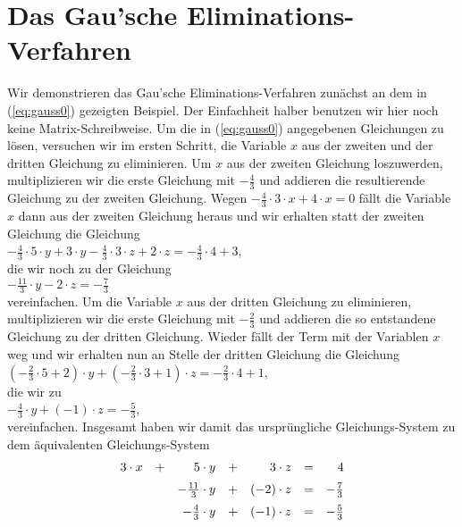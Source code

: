 \section{Das Gau\3'sche Eliminations-Verfahren}
Wir demonstrieren das Gau\3'sche Eliminations-Verfahren zun\"{a}chst an dem in (\ref{eq:gauss0}) gezeigten
Beispiel.  Der Einfachheit halber benutzen wir hier noch keine Matrix-Schreibweise.
Um die in (\ref{eq:gauss0}) angegebenen Gleichungen zu l\"{o}sen, versuchen wir im ersten Schritt, die
Variable $x$ aus der zweiten und der dritten Gleichung zu eliminieren.  Um $x$ aus der zweiten Gleichung
loszuwerden, multiplizieren wir die erste Gleichung mit $-\frac{4}{3}$ und addieren die resultierende
Gleichung zu der zweiten Gleichung.  Wegen $-\frac{4}{3} \cdot 3 \cdot x + 4 \cdot x = 0$ f\"{a}llt die
Variable $x$ dann aus der zweiten Gleichung heraus und wir erhalten statt der zweiten Gleichung die Gleichung
\\[0.2cm]
\hspace*{1.3cm}
$-\frac{4}{3} \cdot 5 \cdot y + 3 \cdot y -\frac{4}{3} \cdot 3 \cdot z + 2 \cdot z = -\frac{4}{3} \cdot 4 + 3$,
\\[0.2cm]
die wir noch zu der Gleichung
\\[0.2cm]
\hspace*{1.3cm}
$-\frac{11}{3} \cdot y - 2 \cdot z = -\frac{7}{3}$
\\[0.2cm]
vereinfachen.  Um die Variable $x$ aus der dritten Gleichung zu eliminieren, multiplizieren wir die
erste Gleichung mit $-\frac{2}{3}$ und addieren die so entstandene Gleichung zu der dritten Gleichung.  
Wieder f\"{a}llt der Term mit der Variablen $x$ weg und wir erhalten nun an Stelle der dritten Gleichung die
Gleichung 
\\[0.2cm]
\hspace*{1.3cm}
$(-\frac{2}{3} \cdot 5 + 2) \cdot y + (-\frac{2}{3} \cdot 3 + 1) \cdot z = -\frac{2}{3} \cdot 4 + 1$,
\\[0.2cm]
die wir zu
\\[0.2cm]
\hspace*{1.3cm}
$-\frac{4}{3} \cdot y + (-1) \cdot z = -\frac{5}{3}$,
\\[0.2cm]
vereinfachen.  Insgesamt haben wir damit das urspr\"{u}ngliche Gleichungs-System zu dem \"{a}quivalenten
Gleichungs-System 
\begin{equation}
  \label{eq:gauss1} 
\begin{array}[c]{rcrcrcr}
  3 \cdot x & + & 5 \cdot y             & + &    3 \cdot z & = &           4  \\[0.2cm]
            &   & -\frac{11}{3} \cdot y & + & (-2) \cdot z & = & -\frac{7}{3} \\[0.2cm]
            &   & -\frac{4}{3}  \cdot y & + & (-1) \cdot z & = & -\frac{5}{3}
\end{array}
\end{equation}
